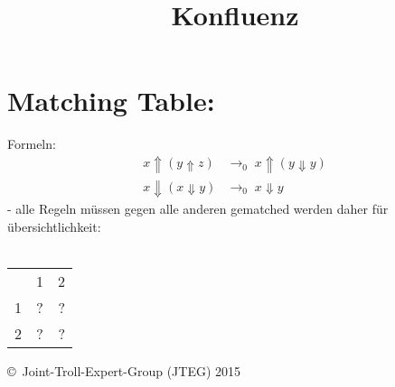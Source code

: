 \documentclass{article}
\title{Konfluenz}
\date{ }
\begin{document}
	\maketitle
		\section{Matching Table:}
			Formeln:
			\begin{align}
				x \Uparrow ( y \Uparrow z) & \rightarrow_{0}
					\; x \Uparrow (y \Downarrow y)
				\\				
				x \Downarrow ( x \Downarrow y ) & \rightarrow_0
					\; x \Downarrow y
			\end{align}
			- alle Regeln m\"ussen gegen alle anderen gematched werden 
			daher f\"ur \"ubersichtlichkeit:\\ \\
			\begin{tabular}{l c r}
				  & 1 & 2 \\
				1 & ? & ? \\
				2 & ? & ? \\
			\end{tabular}		
		
		
		
		
		
		
		
		
		
		
		
		
		
		
		
		
		
		
		
		
	\begin{tiny}
	\copyright\ Joint-Troll-Expert-Group (JTEG) 2015
	\end{tiny}
\end{document}
